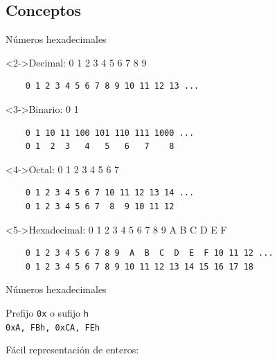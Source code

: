 \subsection{Conceptos}
\begin{frame}[fragile]{Números hexadecimales}
    \begin{uncoverenv}<2->Decimal: 0 1 2 3 4 5 6 7 8 9
    \begin{lstlisting}
    0 1 2 3 4 5 6 7 8 9 10 11 12 13 ...\end{lstlisting}\end{uncoverenv}

    \begin{uncoverenv}<3->Binario: 0 1
    \begin{lstlisting}
    0 1 10 11 100 101 110 111 1000 ...
    0 1  2  3   4   5   6   7    8\end{lstlisting}\end{uncoverenv}

    \begin{uncoverenv}<4->Octal: 0 1 2 3 4 5 6 7
    \begin{lstlisting}
    0 1 2 3 4 5 6 7 10 11 12 13 14 ...
    0 1 2 3 4 5 6 7  8  9 10 11 12\end{lstlisting}\end{uncoverenv}

    \begin{uncoverenv}<5->Hexadecimal: 0 1 2 3 4 5 6 7 8 9 A B C D E F
    \begin{lstlisting}
    0 1 2 3 4 5 6 7 8 9  A  B  C  D  E  F 10 11 12 ...
    0 1 2 3 4 5 6 7 8 9 10 11 12 13 14 15 16 17 18\end{lstlisting}\end{uncoverenv}
\end{frame}

\begin{frame}[fragile]{Números hexadecimales}
    \begin{wideitemize}
        \item<1-> Prefijo \texttt{0x} o sufijo \texttt{h} \\
        \texttt{0xA, FBh, 0xCA, FEh}

        \item<2-> Fácil representación de enteros:
    \end{wideitemize}
\end{frame}

